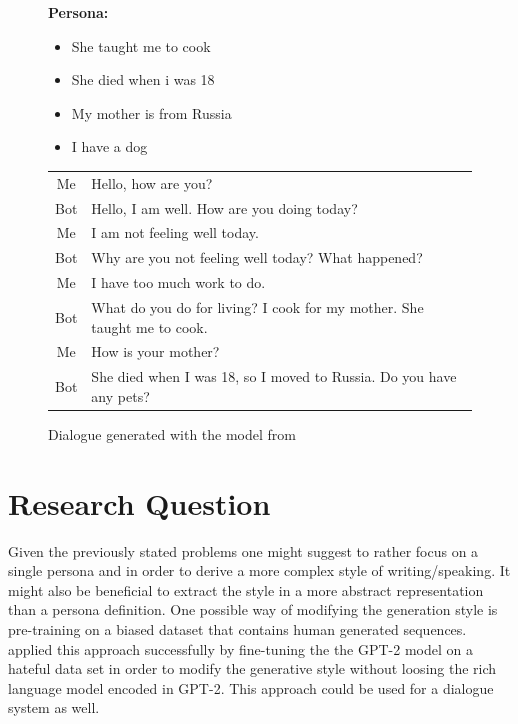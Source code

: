 \documentclass[11pt]{article}
\begin{document}
\begin{figure}[h]
\label{dialogue}
\textbf{Persona:}
\begin{itemize}
\item She taught me to cook
\item She died when i was 18
\item My mother is from Russia
\item I have a dog
\end{itemize}
\begin{tabular}{c | l}
Me & Hello, how are you?\\
Bot & Hello, I am well. How are you doing today?\\
Me & I am not feeling well today.\\
Bot & Why are you not feeling well today? What happened?\\
Me & I have too much work to do.\\
Bot & What do you do for living? I cook for my mother. She taught me to cook.\\
Me & How is your mother?\\
Bot & She died when I was 18, so I moved to Russia. Do you have any pets?
\end{tabular}
\caption[]{Dialogue generated with the model from \cite[]{liu2020impress}}
\end{figure}

\section{Research Question}
Given the previously stated problems one might suggest to rather focus on a single persona and in order to derive a more complex style of writing/speaking. It might also be beneficial to extract the style in a more abstract representation than a persona definition. One possible way of modifying the generation style is pre-training on a biased dataset that contains human generated sequences. \cite[]{wullach2020hate} applied this approach successfully by fine-tuning the the GPT-2 model \cite[]{Radford2019LanguageMA} on a hateful data set in order to modify the generative style without loosing the rich language model encoded in GPT-2. This approach could be used for a dialogue system as well. 
\end{document}
